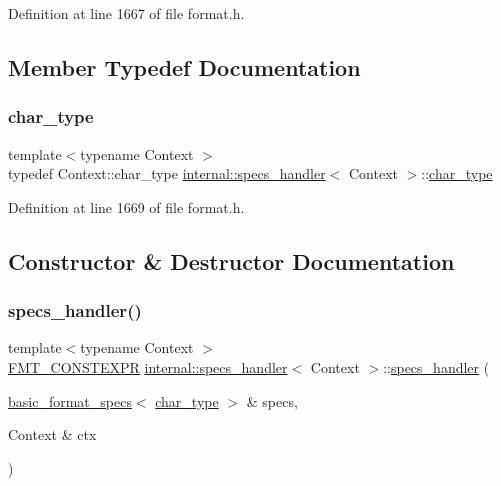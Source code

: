 Definition at line 1667 of file format.\+h.



\subsection{Member Typedef Documentation}
\mbox{\label{classinternal_1_1specs__handler_a1ddb6ad8becb4f481847b58db65200bc}} 
\subsubsection{\texorpdfstring{char\+\_\+type}{char\_type}}
{\footnotesize\ttfamily template$<$typename Context $>$ \\
typedef Context\+::char\+\_\+type \hyperlink{classinternal_1_1specs__handler}{internal\+::specs\+\_\+handler}$<$ Context $>$\+::\hyperlink{classinternal_1_1specs__handler_a1ddb6ad8becb4f481847b58db65200bc}{char\+\_\+type}}



Definition at line 1669 of file format.\+h.



\subsection{Constructor \& Destructor Documentation}
\mbox{\label{classinternal_1_1specs__handler_a94c87e8b33109b0e3ef1ac1edc24aa74}} 
\subsubsection{\texorpdfstring{specs\+\_\+handler()}{specs\_handler()}}
{\footnotesize\ttfamily template$<$typename Context $>$ \\
\hyperlink{core_8h_a69201cb276383873487bf68b4ef8b4cd}{F\+M\+T\+\_\+\+C\+O\+N\+S\+T\+E\+X\+PR} \hyperlink{classinternal_1_1specs__handler}{internal\+::specs\+\_\+handler}$<$ Context $>$\+::\hyperlink{classinternal_1_1specs__handler}{specs\+\_\+handler} (\begin{DoxyParamCaption}\item[{\hyperlink{structbasic__format__specs}{basic\+\_\+format\+\_\+specs}$<$ \hyperlink{classinternal_1_1specs__handler_a1ddb6ad8becb4f481847b58db65200bc}{char\+\_\+type} $>$ \&}]{specs,  }\item[{Context \&}]{ctx }\end{DoxyParamCaption})\hspace{0.3cm}{\ttfamily [inline]}}



